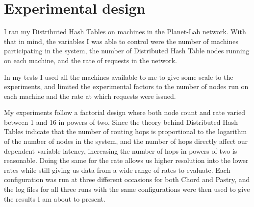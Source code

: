 \section{Experimental design}
I ran my Distributed Hash Tables on machines in the Planet-Lab network. With that in mind, the variables I was able to control were the number of machines participating in the system, the number of Distributed Hash Table nodes running on each machine, and the rate of requests in the network.

In my tests I used all the machines available to me to give some scale to the experiments, and limited the experimental factors to the number of nodes run on each machine and the rate at which requests were issued.

My experiments follow a factorial design where both node count and rate varied between 1 and 16 in powers of two. Since the theory behind Distributed Hash Tables indicate that the number of routing hops is proportional to the logarithm of the number of nodes in the system, and the number of hops directly affect our dependent variable latency, increasing the number of hops in powers of two is reasonable. Doing the same for the rate allows us higher resolution into the lower rates while still giving us data from a wide range of rates to evaluate.
Each configuration was run at three different occasions for both Chord and Pastry, and the log files for all three runs with the same configurations were then used to give the results I am about to present.

